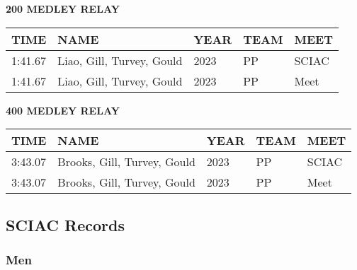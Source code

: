 \begin{table}[H]
\centering
\begin{minipage}[t]{0.6\textwidth}
\centering
\textbf{200 MEDLEY RELAY}\\[0.1cm]
\begin{tabular}{@{}p{1.8cm}p{2.8cm}p{1.2cm}p{1.4cm}p{1.4cm}@{}}
\hline
    \textbf{TIME} & \textbf{NAME} & \textbf{YEAR} & \textbf{TEAM} & \textbf{MEET} \\
\hline
    1:41.67 & Liao, Gill, Turvey, Gould & 2023 & PP & SCIAC \\
    1:41.67 & Liao, Gill, Turvey, Gould & 2023 & PP & Meet \\
\hline
\end{tabular}
\end{minipage}
\end{table}

\begin{table}[H]
\centering
\begin{minipage}[t]{0.6\textwidth}
\centering
\textbf{400 MEDLEY RELAY}\\[0.1cm]
\begin{tabular}{@{}p{1.8cm}p{2.8cm}p{1.2cm}p{1.4cm}p{1.4cm}@{}}
\hline
    \textbf{TIME} & \textbf{NAME} & \textbf{YEAR} & \textbf{TEAM} & \textbf{MEET} \\
\hline
    3:43.07 & Brooks, Gill, Turvey, Gould & 2023 & PP & SCIAC \\
    3:43.07 & Brooks, Gill, Turvey, Gould & 2023 & PP & Meet \\
\hline
\end{tabular}
\end{minipage}
\end{table}


\newpage

\subsection{SCIAC Records}
\subsubsection{Men}

